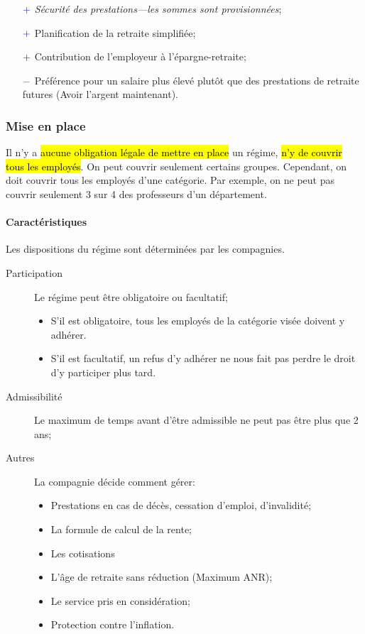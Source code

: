 \documentclass[10pt, french]{article}
\begin{document}
\begin{multicols*}{3}
\begin{description}
\begin{itemize}[leftmargin = *]
		\item[$\color{blue}+$]	\textit{Sécurité des prestations---les sommes sont provisionnées};
		\item[$\color{blue}+$]	Planification de la retraite simplifiée;
		\item[$\color{blue}+$]	Contribution de l'employeur à l'épargne-retraite;
		\item[$\color{red}-$]	Préférence pour un salaire plus élevé plutôt que des prestations de retraite  futures (Avoir l'argent maintenant).
		\end{itemize}
\end{description}

\subsubsection*{Mise en place}
Il n'y a \hl{aucune obligation légale de mettre en place} un régime, \hl{n'y de couvrir tous les employés}. On peut couvrir seulement certains groupes. Cependant, on doit couvrir tous les employés d'une catégorie. Par exemple, on ne peut pas couvrir seulement 3 sur 4 des professeurs d'un département.

\paragraph*{Caractéristiques}	Les dispositions du régime sont déterminées par les compagnies.
\begin{description}
	\item[Participation]	Le régime peut être obligatoire ou facultatif;
		\begin{itemize}[leftmargin = *]
		\item 	S'il est obligatoire, tous les employés de la catégorie visée doivent y adhérer.
		\item	S'il est facultatif, un refus d'y adhérer ne nous fait pas perdre le droit d'y participer plus tard.
		\end{itemize}
	\item[Admissibilité]	Le maximum de temps avant d'être admissible ne peut pas être plus que 2 ans;
	\item[Autres]	La compagnie décide comment gérer:
		\begin{itemize}[leftmargin = *]
		\item	Prestations en cas de décès, cessation d'emploi, d'invalidité;
		\item	La formule de calcul de la rente;
		\item	Les cotisations
		\item	L'âge de retraite sans réduction (Maximum ANR);
		\item	Le service pris en considération;
		\item	Protection contre l'inflation.
		\end{itemize}
\end{description}



\end{multicols*}
\end{document}
